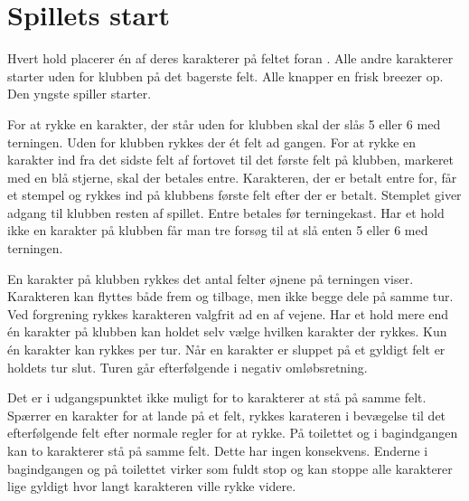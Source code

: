 \section{Spillets start}
Hvert hold placerer én af deres karakterer på feltet foran \LeClub . Alle andre karakterer starter uden for klubben på det bagerste felt. Alle knapper en frisk breezer op. Den yngste spiller starter. 

For at rykke en karakter, der står uden for klubben skal der slås 5 eller 6 med terningen. Uden for klubben rykkes der ét felt ad gangen. For at rykke en karakter ind fra det sidste felt af fortovet til det første felt på klubben, markeret med en blå stjerne, skal der betales entre. Karakteren, der er betalt entre for, får et stempel og rykkes ind på klubbens første felt efter der er betalt. Stemplet giver adgang til klubben resten af spillet. Entre betales før terningekast. Har et hold ikke en karakter på klubben får man tre forsøg til at slå enten 5 eller 6 med terningen.

En karakter på klubben rykkes det antal felter øjnene på terningen viser. Karakteren kan flyttes både frem og tilbage, men ikke begge dele på samme tur. Ved forgrening rykkes karakteren valgfrit ad en af vejene. Har et hold mere end én karakter på klubben kan holdet selv vælge hvilken karakter der rykkes. Kun én karakter kan rykkes per tur. Når en karakter er sluppet på et gyldigt felt er holdets tur slut. Turen går efterfølgende i negativ omløbsretning. 

Det er i udgangspunktet ikke muligt for to karakterer at stå på samme felt. Spærrer en karakter for at lande på et felt, rykkes karateren i bevægelse til det efterfølgende felt efter normale regler for at rykke. På toilettet og i bagindgangen kan to karakterer stå på samme felt. Dette har ingen konsekvens. Enderne i bagindgangen og på toilettet virker som fuldt stop og kan stoppe alle karakterer lige gyldigt hvor langt karakteren ville rykke videre.